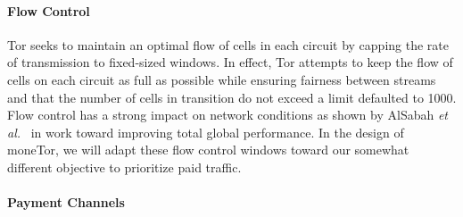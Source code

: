 \paragraph*{Flow Control} Tor seeks to maintain an optimal flow of cells in
each circuit by capping the rate of transmission to fixed-sized windows.
In effect, Tor attempts to
keep the flow of cells on each circuit as full as possible while ensuring fairness between streams and that
the number of cells in transition do not exceed a limit defaulted to 1000. Flow control has a
strong impact on network conditions as shown by AlSabah \textit{et
  al.}~\cite{pets2011-defenestrator} in work toward improving total global
performance.  In the design of moneTor, we will adapt these flow control windows
toward our somewhat different objective to prioritize paid traffic.

\paragraph*{Payment Channels}

%

